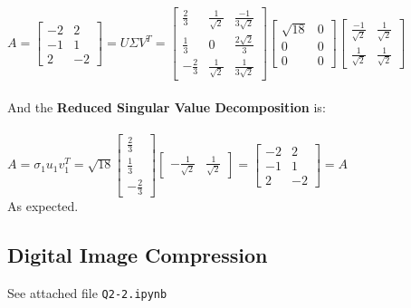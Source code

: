\documentclass[12pt]{article}
\begin{document}
\begin{enumerate}[label=(\alph*)]
$A = \begin{bmatrix}
    -2 & 2 \\
    -1 & 1 \\ 
    2 & -2 
\end{bmatrix} = U\Sigma V^T = \begin{bmatrix}
    \frac{2}{3} & \frac{1}{\sqrt{2}} & \frac{-1}{3\sqrt{2}} \\
    \frac{1}{3} & 0 & \frac{2\sqrt{2}}{3} \\
    -\frac{2}{3} & \frac{1}{\sqrt{2}} & \frac{1}{3\sqrt{2}}
\end{bmatrix} \begin{bmatrix}
    \sqrt{18} & 0 \\ 0 & 0 \\ 0 & 0
\end{bmatrix} \begin{bmatrix}
    \frac{-1}{\sqrt{2}} & \frac{1}{\sqrt{2}} \\ 
    \frac{1}{\sqrt{2}} & \frac{1}{\sqrt{2}} 
\end{bmatrix}$ \\\\

And the \textbf{Reduced Singular Value Decomposition} is: \\ \\
$A = \sigma_1 u_1 v_1^T = 
\sqrt{18}
\begin{bmatrix}
    \frac{2}{3} \\ \frac{1}{3} \\ -\frac{2}{3}
\end{bmatrix}
\begin{bmatrix}
    -\frac{1}{\sqrt{2}} & \frac{1}{\sqrt{2}}
\end{bmatrix} 
= \begin{bmatrix}
    -2 & 2 \\
    -1 & 1 \\ 
    2 & -2 
\end{bmatrix} = A$ \\
As expected.
\end{enumerate}

\subsection{Digital Image Compression}
See attached file \texttt{Q2-2.ipynb}
\end{document}

